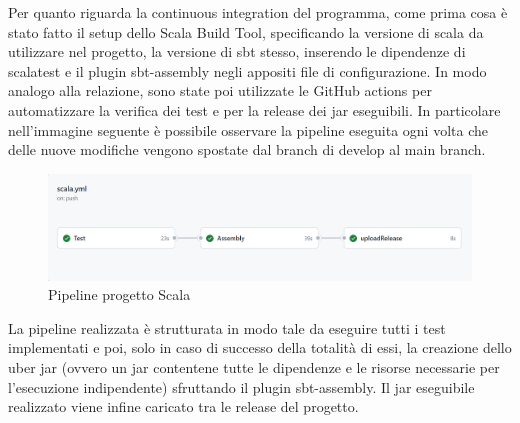     Per quanto riguarda la continuous integration del programma, come prima cosa è stato fatto il setup dello Scala Build Tool, specificando la versione di scala da utilizzare nel progetto, la versione di sbt stesso, inserendo le dipendenze di scalatest e il plugin sbt-assembly negli appositi file di configurazione. In modo analogo alla relazione, sono state poi utilizzate le GitHub actions per automatizzare la verifica dei test e per la release dei jar eseguibili. In particolare nell'immagine seguente è possibile osservare la pipeline eseguita ogni volta che delle nuove modifiche vengono spostate dal branch di develop al main branch.

    \begin{figure}[H]
        \caption{Pipeline progetto Scala}
        \label{fig:scala-ci-github}
        \centering
        \includegraphics[width=1\textwidth]{Images/scalaCI-pipeline.png}
    \end{figure}

    La pipeline realizzata è strutturata in modo tale da eseguire tutti i test implementati e poi, solo in caso di successo della totalità di essi, la creazione dello uber jar (ovvero un jar contentene tutte le dipendenze e le risorse necessarie per l'esecuzione indipendente) sfruttando il plugin sbt-assembly. Il jar eseguibile realizzato viene infine caricato tra le release del progetto.






